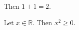 \documentclass[12pt]{article}
\begin{document}
Then $1+1=2$.

Let $x\in\mathbb{R}$. Then $x^2\geq 0$.
\end{document}
